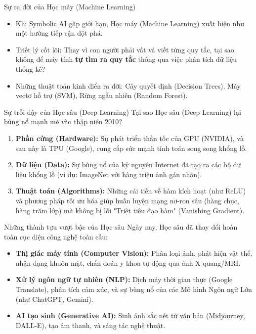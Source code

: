 \documentclass[aspectratio=169]{beamer}
\begin{document}
\begin{frame}{Sự ra đời của Học máy (Machine Learning)}
    \begin{itemize}
        \item Khi Symbolic AI gặp giới hạn, Học máy (Machine Learning) xuất hiện như một hướng tiếp cận đột phá.
        \item Triết lý cốt lõi: Thay vì con người phải vất vả viết từng quy tắc, tại sao không để máy tính \textbf{tự tìm ra quy tắc} thông qua việc phân tích dữ liệu thống kê?
        \item Những thuật toán kinh điển ra đời: Cây quyết định (Decision Trees), Máy vectơ hỗ trợ (SVM), Rừng ngẫu nhiên (Random Forest).
    \end{itemize}
\end{frame}

\begin{frame}{Sự trỗi dậy của Học sâu (Deep Learning)}
    Tại sao Học sâu (Deep Learning) lại bùng nổ mạnh mẽ vào thập niên 2010?
    \begin{enumerate}
        \item \textbf{Phần cứng (Hardware):} Sự phát triển thần tốc của GPU (NVIDIA), và sau này là TPU (Google), cung cấp sức mạnh tính toán song song khổng lồ.
        \item \textbf{Dữ liệu (Data):} Sự bùng nổ của kỷ nguyên Internet đã tạo ra các bộ dữ liệu khổng lồ (ví dụ: ImageNet với hàng triệu ảnh gán nhãn).
        \item \textbf{Thuật toán (Algorithms):} Những cải tiến về hàm kích hoạt (như ReLU) và phương pháp tối ưu hóa giúp huấn luyện mạng nơ-ron sâu (hàng chục, hàng trăm lớp) mà không bị lỗi "Triệt tiêu đạo hàm" (Vanishing Gradient).
    \end{enumerate}
\end{frame}

\begin{frame}{Những thành tựu vượt bậc của Học sâu}
    Ngày nay, Học sâu đã thay đổi hoàn toàn cục diện công nghệ toàn cầu:
    \begin{itemize}
        \item \textbf{Thị giác máy tính (Computer Vision):} Phân loại ảnh, phát hiện vật thể, nhận dạng khuôn mặt, chẩn đoán y khoa tự động qua ảnh X-quang/MRI.
        \item \textbf{Xử lý ngôn ngữ tự nhiên (NLP):} Dịch máy thời gian thực (Google Translate), phân tích cảm xúc, và sự bùng nổ của các Mô hình Ngôn ngữ Lớn (như ChatGPT, Gemini).
        \item \textbf{AI tạo sinh (Generative AI):} Sinh ảnh sắc nét từ văn bản (Midjourney, DALL-E), tạo âm thanh, và sáng tác nghệ thuật.
    \end{itemize}
\end{frame}
\end{document}
